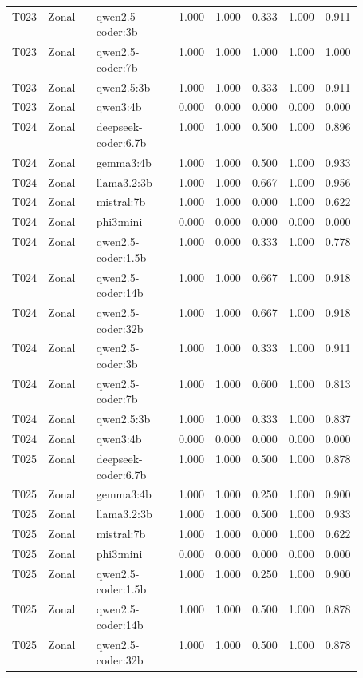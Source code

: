 \begin{longtable}{p{0.08\linewidth}p{0.16\linewidth}p{0.27\linewidth}rrrrr}
T023 & Zonal & qwen2.5-coder:3b & 1.000 & 1.000 & 0.333 & 1.000 & 0.911 \\
T023 & Zonal & qwen2.5-coder:7b & 1.000 & 1.000 & 1.000 & 1.000 & 1.000 \\
T023 & Zonal & qwen2.5:3b & 1.000 & 1.000 & 0.333 & 1.000 & 0.911 \\
T023 & Zonal & qwen3:4b & 0.000 & 0.000 & 0.000 & 0.000 & 0.000 \\
T024 & Zonal & deepseek-coder:6.7b & 1.000 & 1.000 & 0.500 & 1.000 & 0.896 \\
T024 & Zonal & gemma3:4b & 1.000 & 1.000 & 0.500 & 1.000 & 0.933 \\
T024 & Zonal & llama3.2:3b & 1.000 & 1.000 & 0.667 & 1.000 & 0.956 \\
T024 & Zonal & mistral:7b & 1.000 & 1.000 & 0.000 & 1.000 & 0.622 \\
T024 & Zonal & phi3:mini & 0.000 & 0.000 & 0.000 & 0.000 & 0.000 \\
T024 & Zonal & qwen2.5-coder:1.5b & 1.000 & 0.000 & 0.333 & 1.000 & 0.778 \\
T024 & Zonal & qwen2.5-coder:14b & 1.000 & 1.000 & 0.667 & 1.000 & 0.918 \\
T024 & Zonal & qwen2.5-coder:32b & 1.000 & 1.000 & 0.667 & 1.000 & 0.918 \\
T024 & Zonal & qwen2.5-coder:3b & 1.000 & 1.000 & 0.333 & 1.000 & 0.911 \\
T024 & Zonal & qwen2.5-coder:7b & 1.000 & 1.000 & 0.600 & 1.000 & 0.813 \\
T024 & Zonal & qwen2.5:3b & 1.000 & 1.000 & 0.333 & 1.000 & 0.837 \\
T024 & Zonal & qwen3:4b & 0.000 & 0.000 & 0.000 & 0.000 & 0.000 \\
T025 & Zonal & deepseek-coder:6.7b & 1.000 & 1.000 & 0.500 & 1.000 & 0.878 \\
T025 & Zonal & gemma3:4b & 1.000 & 1.000 & 0.250 & 1.000 & 0.900 \\
T025 & Zonal & llama3.2:3b & 1.000 & 1.000 & 0.500 & 1.000 & 0.933 \\
T025 & Zonal & mistral:7b & 1.000 & 1.000 & 0.000 & 1.000 & 0.622 \\
T025 & Zonal & phi3:mini & 0.000 & 0.000 & 0.000 & 0.000 & 0.000 \\
T025 & Zonal & qwen2.5-coder:1.5b & 1.000 & 1.000 & 0.250 & 1.000 & 0.900 \\
T025 & Zonal & qwen2.5-coder:14b & 1.000 & 1.000 & 0.500 & 1.000 & 0.878 \\
T025 & Zonal & qwen2.5-coder:32b & 1.000 & 1.000 & 0.500 & 1.000 & 0.878 \\

\end{longtable}
